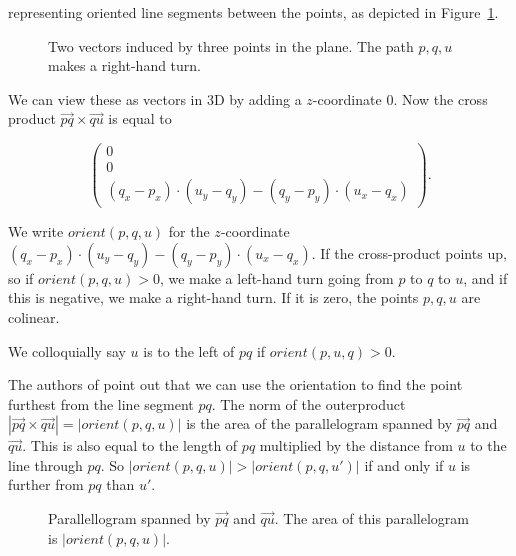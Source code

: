 representing oriented line segments between the points, as depicted in
Figure~\ref{fig:orient1}.

\begin{figure}[ht]
    \caption{Two vectors induced by three points in the plane. The path 
             $p, q, u$ makes a right-hand turn.}
    \label{fig:orient1}
\end{figure}

We can view these as vectors in 3D by adding a $z$-coordinate $0$. Now the
cross product $\vec{pq} \times \vec{qu}$ is equal to 

\[
    \begin{pmatrix}
        0 \\
        0 \\
        (q_x - p_x) \cdot (u_y - q_y) - (q_y - p_y) \cdot (u_x - q_x)
    \end{pmatrix}.
\]

We write $orient(p, q, u)$ for the $z$-coordinate
$(q_x - p_x) \cdot (u_y - q_y) - (q_y - p_y) \cdot (u_x - q_x)$. 
If the cross-product points up, so if $orient(p, q, u) > 0$, we make a left-hand 
turn going from $p$ to $q$ to $u$, and if this is negative, we make a right-hand
turn. If it is zero, the points $p, q, u$ are colinear. 

We colloquially say $u$ is to the left of $pq$ if $orient(p, u, q) > 0$.

The authors of \cite{quickerthanqhull} point out that we can use the 
orientation to find the point furthest from the line segment $pq$. 
The norm of the outerproduct
$|\vec{pq} \times \vec{qu}| = |orient(p, q, u)|$ is the area of the
parallelogram spanned by $\vec{pq}$ and $\vec{qu}$. This is also equal to
the length of $pq$ multiplied by the distance from $u$ to the line through 
$pq$. So $|orient(p, q, u)| > |orient(p, q, u')|$ if and only if $u$ is further
from $pq$ than $u'$. 

\begin{figure}[ht]
    \caption{Parallellogram spanned by $\vec{pq}$ and $\vec{qu}$. 
             The area of this parallelogram is $|orient(p, q, u)|$.}
    \label{fig:orient2}
\end{figure}

